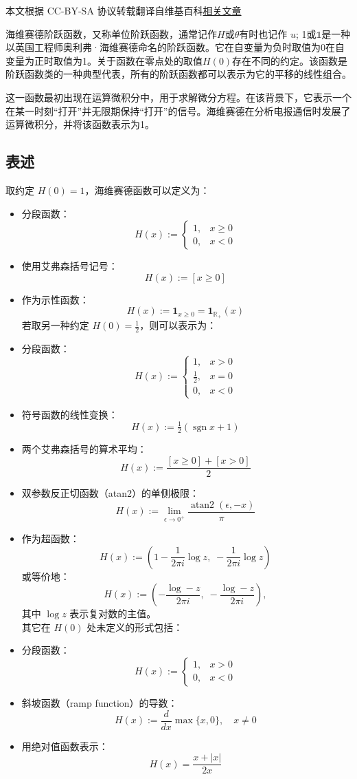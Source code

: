 
本文根据 CC-BY-SA 协议转载翻译自维基百科\href{https://en.wikipedia.org/wiki/Heaviside_step_function}{相关文章}

海维赛德阶跃函数，又称单位阶跃函数，通常记作$H$或$\theta$有时也记作 $u$; 1或$\mathbb{1}$是一种以英国工程师奥利弗·海维赛德命名的阶跃函数。它在自变量为负时取值为0在自变量为正时取值为1。关于函数在零点处的取值$H(0)$存在不同的约定。该函数是阶跃函数类的一种典型代表，所有的阶跃函数都可以表示为它的平移的线性组合。

这一函数最初出现在运算微积分中，用于求解微分方程。在该背景下，它表示一个在某一时刻“打开”并无限期保持“打开”的信号。海维赛德在分析电报通信时发展了运算微积分，并将该函数表示为1。  
\subsection{表述}
取约定 $H(0) = 1$，海维赛德函数可以定义为：

\begin{itemize}
\item 分段函数：
$$
H(x) := 
\begin{cases} 
1, & x \geq 0 \\[6pt] 
0, & x < 0 
\end{cases}~
$$
\item 使用艾弗森括号记号：
$$
H(x) := [x \geq 0]~
$$
\item 作为示性函数：
$$
H(x) := \mathbf{1}_{x \geq 0} = \mathbf{1}_{\mathbb{R}_{+}}(x)~
$$
若取另一种约定 $H(0) = \tfrac{1}{2}$，则可以表示为：
\item 分段函数：
$$
H(x) := 
\begin{cases} 
1, & x > 0 \\[6pt] 
\tfrac{1}{2}, & x = 0 \\[6pt] 
0, & x < 0 
\end{cases}~
$$
\item 符号函数的线性变换：
$$
H(x) := \tfrac{1}{2}\left(\operatorname{sgn}x + 1\right)~
$$
\item 两个艾弗森括号的算术平均：
$$
H(x) := \frac{[x \geq 0] + [x > 0]}{2}~
$$
\item 双参数反正切函数（atan2）的单侧极限：
$$
H(x) := \lim_{\epsilon \to 0^{+}} \frac{\operatorname{atan2}(\epsilon, -x)}{\pi}~
$$
\item 作为超函数：
$$
H(x) := \left( 1 - \frac{1}{2\pi i}\log z, \; -\frac{1}{2\pi i}\log z \right)~
$$
或等价地：
$$
H(x) := \left( -\frac{\log-z}{2\pi i}, \; -\frac{\log-z}{2\pi i} \right),~
$$
其中 $\log z$ 表示复对数的主值。\\
其它在 $H(0)$ 处未定义的形式包括：
\item 分段函数：
$$
H(x) := 
\begin{cases} 
1, & x > 0 \\[6pt] 
0, & x < 0 
\end{cases}~
$$
\item 斜坡函数（ramp function）的导数：
$$
H(x) := \frac{d}{dx}\max\{x,0\}, \quad x \neq 0~
$$
\item 用绝对值函数表示：
$$
H(x) = \frac{x + |x|}{2x}~
$$
\end{itemize}

